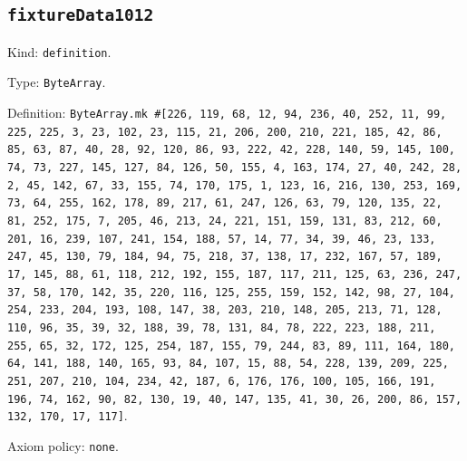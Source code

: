\documentclass[11pt]{article}
\begin{document}
\subsection*{\texttt{fixtureData1012}}
\noindent Kind: \texttt{definition}.\par
\noindent Type: \texttt{ByteArray}.\par
\noindent Definition: \texttt{ByteArray.mk \#[226, 119, 68, 12, 94, 236, 40, 252, 11, 99, 225, 225, 3, 23, 102, 23, 115, 21, 206, 200, 210, 221, 185, 42, 86, 85, 63, 87, 40, 28, 92, 120, 86, 93, 222, 42, 228, 140, 59, 145, 100, 74, 73, 227, 145, 127, 84, 126, 50, 155, 4, 163, 174, 27, 40, 242, 28, 2, 45, 142, 67, 33, 155, 74, 170, 175, 1, 123, 16, 216, 130, 253, 169, 73, 64, 255, 162, 178, 89, 217, 61, 247, 126, 63, 79, 120, 135, 22, 81, 252, 175, 7, 205, 46, 213, 24, 221, 151, 159, 131, 83, 212, 60, 201, 16, 239, 107, 241, 154, 188, 57, 14, 77, 34, 39, 46, 23, 133, 247, 45, 130, 79, 184, 94, 75, 218, 37, 138, 17, 232, 167, 57, 189, 17, 145, 88, 61, 118, 212, 192, 155, 187, 117, 211, 125, 63, 236, 247, 37, 58, 170, 142, 35, 220, 116, 125, 255, 159, 152, 142, 98, 27, 104, 254, 233, 204, 193, 108, 147, 38, 203, 210, 148, 205, 213, 71, 128, 110, 96, 35, 39, 32, 188, 39, 78, 131, 84, 78, 222, 223, 188, 211, 255, 65, 32, 172, 125, 254, 187, 155, 79, 244, 83, 89, 111, 164, 180, 64, 141, 188, 140, 165, 93, 84, 107, 15, 88, 54, 228, 139, 209, 225, 251, 207, 210, 104, 234, 42, 187, 6, 176, 176, 100, 105, 166, 191, 196, 74, 162, 90, 82, 130, 19, 40, 147, 135, 41, 30, 26, 200, 86, 157, 132, 170, 17, 117]}.\par
\noindent Axiom policy: \texttt{none}.\par
\end{document}
